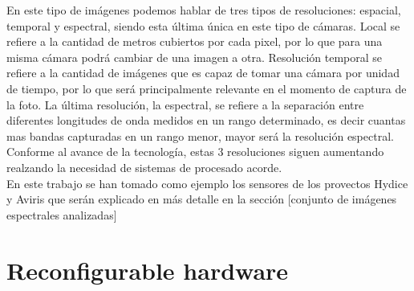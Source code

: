 \bigskip
En este tipo de imágenes podemos hablar de tres tipos de resoluciones: espacial, temporal y espectral, siendo esta última única en este tipo de cámaras. Local se refiere a la cantidad de metros cubiertos por cada pixel, por lo que para una misma cámara podrá cambiar de una imagen a otra. Resolución temporal se refiere a la cantidad de imágenes que es capaz de tomar una cámara por unidad de tiempo, por lo que será principalmente relevante en el momento de captura de la foto. La última resolución, la espectral, se refiere a la separación entre diferentes longitudes de onda medidos en un rango determinado, es decir cuantas mas bandas capturadas en un rango menor, mayor será la resolución espectral.
\\
Conforme al avance de la tecnología, estas 3 resoluciones siguen aumentando realzando la necesidad de sistemas de procesado acorde.
\\
En este trabajo se han tomado como ejemplo los sensores de los provectos Hydice y Aviris que serán explicado en más detalle en la sección [conjunto de imágenes espectrales analizadas]


\section{Reconfigurable hardware}

